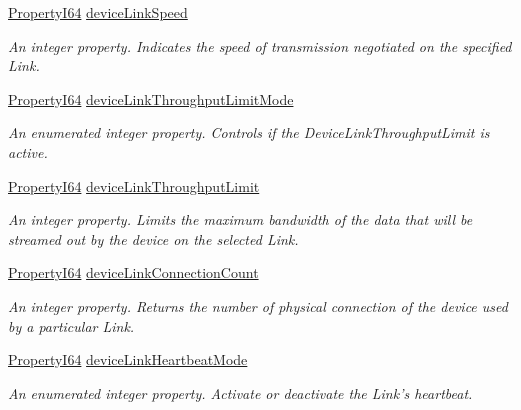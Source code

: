 \begin{DoxyCompactItemize}
\hyperlink{group___common_interface_ga81749b2696755513663492664a18a893}{Property\+I64} \hyperlink{classmv_i_m_p_a_c_t_1_1acquire_1_1_gen_i_cam_1_1_device_control_aa266deca5b9087f6f9ad1413bdff8b2b}{device\+Link\+Speed}
\begin{DoxyCompactList}\small\item\em An integer property. Indicates the speed of transmission negotiated on the specified Link. \end{DoxyCompactList}\item 
\hyperlink{group___common_interface_ga81749b2696755513663492664a18a893}{Property\+I64} \hyperlink{classmv_i_m_p_a_c_t_1_1acquire_1_1_gen_i_cam_1_1_device_control_aa62067822dcac218a6126ece65f7bee1}{device\+Link\+Throughput\+Limit\+Mode}
\begin{DoxyCompactList}\small\item\em An enumerated integer property. Controls if the Device\+Link\+Throughput\+Limit is active. \end{DoxyCompactList}\item 
\hyperlink{group___common_interface_ga81749b2696755513663492664a18a893}{Property\+I64} \hyperlink{classmv_i_m_p_a_c_t_1_1acquire_1_1_gen_i_cam_1_1_device_control_a270167ff893fedfc0e457f880f061d90}{device\+Link\+Throughput\+Limit}
\begin{DoxyCompactList}\small\item\em An integer property. Limits the maximum bandwidth of the data that will be streamed out by the device on the selected Link. \end{DoxyCompactList}\item 
\hyperlink{group___common_interface_ga81749b2696755513663492664a18a893}{Property\+I64} \hyperlink{classmv_i_m_p_a_c_t_1_1acquire_1_1_gen_i_cam_1_1_device_control_ad484aba1d95520e246b7712354aaaa47}{device\+Link\+Connection\+Count}
\begin{DoxyCompactList}\small\item\em An integer property. Returns the number of physical connection of the device used by a particular Link. \end{DoxyCompactList}\item 
\hyperlink{group___common_interface_ga81749b2696755513663492664a18a893}{Property\+I64} \hyperlink{classmv_i_m_p_a_c_t_1_1acquire_1_1_gen_i_cam_1_1_device_control_a32f500ffc1ec75a4776f685e243e653b}{device\+Link\+Heartbeat\+Mode}
\begin{DoxyCompactList}\small\item\em An enumerated integer property. Activate or deactivate the Link's heartbeat. \end{DoxyCompactList}\item 

\end{DoxyCompactItemize}
